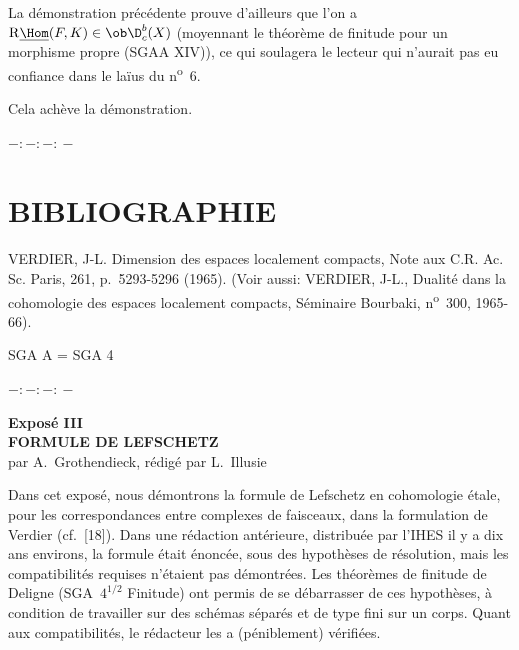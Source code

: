 La démonstration précédente prouve d'ailleurs que l'on a $\mathrm{R}\underline{\Hom}(F,K)\in\ob\D_c^b(X)$ (moyennant le théorème de finitude pour un morphisme propre (SGAA XIV)), ce qui soulagera le lecteur qui n'aurait pas eu confiance dans le laïus du n\textsuperscript{o}~6.

Cela achève la démonstration.

\begin{center}
$-:\!-:\!-:\!-$
\end{center}

\section*{BIBLIOGRAPHIE}

\begin{enumerate}[label={[\arabic*]}]
\item VERDIER, J-L. Dimension des espaces localement compacts, Note aux C.R. Ac. Sc. Paris, 261, p.~5293-5296 (1965). (Voir aussi: VERDIER, J-L., Dualité dans la cohomologie des espaces localement compacts, Séminaire Bourbaki, n\textsuperscript{o}~300, 1965-66).
\end{enumerate}

SGA A = SGA 4

\begin{center}
$-:\!-:\!-:\!-$
\end{center}

\clearpage
\begin{center}
{\Large \textbf{Exposé III}}\\[0.4em]
{\large \textbf{FORMULE DE LEFSCHETZ}}\\[0.3em]
par A.~Grothendieck, rédigé par L.~Illusie
\end{center}
\renewenvironment{statement}[1]{\par\medskip\noindent\textbf{#1}\ }{\par\medskip}
\renewenvironment{prooftext}[1][Proof]{\par\noindent\emph{#1}\ }{\par\medskip}


Dans cet exposé, nous démontrons la formule de Lefschetz en cohomologie étale, pour les correspondances entre complexes de faisceaux, dans la formulation de Verdier (cf.~[18]). Dans une rédaction antérieure, distribuée par l'IHES il y a dix ans environs, la formule était énoncée, sous des hypothèses de résolution, mais les compatibilités requises n'étaient pas démontrées. Les théorèmes de finitude de Deligne (SGA~$4^{1/2}$ Finitude) ont permis de se débarrasser de ces hypothèses, à condition de travailler sur des schémas séparés et de type fini sur un corps. Quant aux compatibilités, le rédacteur les a (péniblement) vérifiées.

